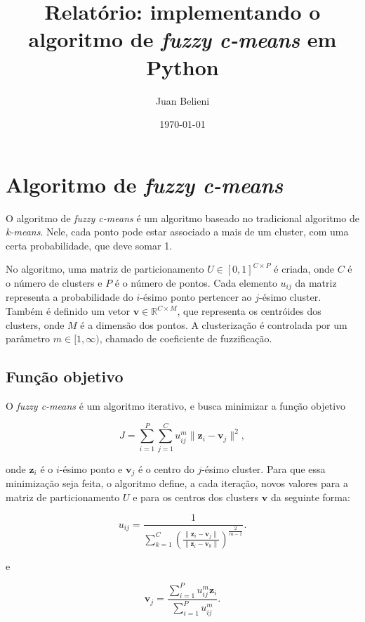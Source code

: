 \documentclass[a4paper, 11pt]{article}
\author{Juan Belieni}
\title{Relatório: implementando o algoritmo de \textit{fuzzy c-means} em Python}
\date{\today}
\begin{document}
\maketitle

\section{Algoritmo de \textit{fuzzy c-means}}

O algoritmo de \textit{fuzzy c-means}\cite{bartak_jastrzebska_2022} é um algoritmo baseado no tradicional algoritmo de \textit{k-means}.
Nele, cada ponto pode estar associado a mais de um cluster, com uma certa probabilidade, que deve somar 1.

No algoritmo, uma matriz de particionamento $U \in [0, 1]^{C \times P}$ é criada, onde $C$ é o número de clusters e $P$ é o número de pontos.
Cada elemento $u_{ij}$ da matriz representa a probabilidade do $i$-ésimo ponto pertencer ao $j$-ésimo cluster.
Também é definido um vetor $\mathbf v \in \mathbb R^{C \times M}$, que representa os centróides dos clusters, onde $M$ é a dimensão dos pontos.
A clusterização é controlada por um parâmetro $m \in [1, \infty)$, chamado de coeficiente de fuzzificação.

\subsection{Função objetivo}

O \textit{fuzzy c-means} é um algoritmo iterativo, e busca minimizar a função objetivo

\begin{equation}
J = \sum_{i=1}^P \sum_{j=1}^C u_{ij}^m \| \mathbf z_i - \mathbf v_j \|^2,
\end{equation}

onde $\mathbf z_i$ é o $i$-ésimo ponto e $\mathbf v_j$ é o centro do $j$-ésimo cluster.
Para que essa minimização seja feita, o algoritmo define, a cada iteração, novos valores para a matriz de particionamento $U$ e para os centros dos clusters $\mathbf v$ da seguinte forma:

\begin{equation}
u_{ij} = \frac{1}{\sum_{k=1}^C \left( \frac{\| \mathbf z_i - \mathbf v_j \|}{\| \mathbf z_i - \mathbf v_k \|} \right)^{\frac{2}{m-1}}}.
\end{equation}

e

\begin{equation}
\mathbf v_j = \frac{\sum_{i=1}^P u_{ij}^m \mathbf z_i}{\sum_{i=1}^P u_{ij}^m}.
\end{equation}
\end{document}
